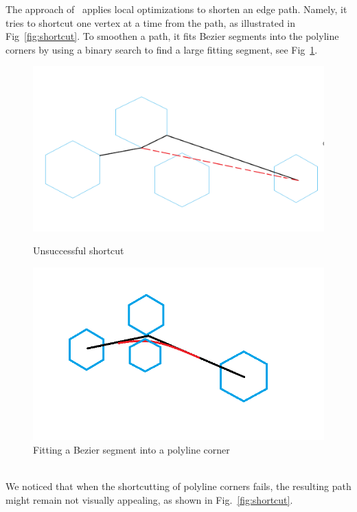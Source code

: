 \documentclass{gd-llncs}
\begin{document}
The approach of~\cite{dwyer2010fast} applies local optimizations to shorten an edge path.
Namely, it tries to shortcut one vertex at a time from the path, as illustrated in Fig~\ref{fig:shortcut}.
To smoothen a path, it fits Bezier segments into the polyline corners by
using a binary search to find a large fitting segment, see Fig~\ref{fig:cornerfit}.
\begin{figure}[!tbp]
  \centering
  \begin{minipage}[b]{0.4\textwidth}
    \includegraphics[width=\textwidth]{./naive_shorcut_now_working.png}
    \caption{Unsuccessful shortcut}
    \label{fig:shortcut}
  \end{minipage}
  \hfill
  \begin{minipage}[b]{0.4\textwidth}
    \includegraphics[width=\textwidth]{fillet_corner.png}
    \caption{Fitting a Bezier segment into a polyline corner}
    \label{fig:cornerfit}
  \end{minipage}
\end{figure}
\\
We noticed that when the shortcutting of polyline corners fails, the resulting path might remain not visually appealing, as shown in Fig.~\ref{fig:shortcut}.
\end{document}
